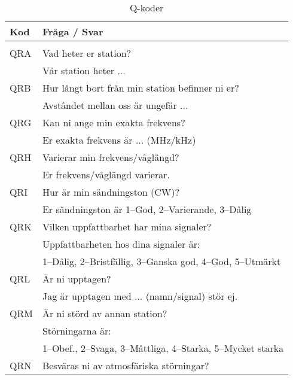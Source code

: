 \begin{longtable}{ll}
	\textbf{Kod} & \textbf{Fråga / Svar}                                                         \\ \hline
	\endhead
	\caption{Q-koder}\\
\endlastfoot
	QRA & Vad heter er station?                                                \\
	    & Vår station heter ...                                                \\ \hline
	QRB & Hur långt bort från min station befinner ni er?                      \\
	    & Avståndet mellan oss är ungefär ...                                  \\ \hline
	QRG & Kan ni ange min exakta frekvens?                                     \\
	    & Er exakta frekvens är ... (MHz/kHz)                                  \\ \hline
	QRH & Varierar min frekvens/våglängd?                                      \\
	    & Er frekvens/våglängd varierar.                                       \\ \hline
	QRI & Hur är min sändningston (CW)?                                        \\
	    & Er sändningston är 1--God, 2--Varierande, 3--Dålig                   \\ \hline
	QRK & Vilken uppfattbarhet har mina signaler?                              \\
	    & Uppfattbarheten hos dina signaler är:                                \\
	    & 1--Dålig, 2--Bristfällig, 3--Ganska god, 4--God, 5--Utmärkt          \\ \hline
	QRL & Är ni upptagen?                                                      \\
	    & Jag är upptagen med ... (namn/signal) stör ej.                       \\ \hline
	QRM & Är ni störd av annan station?                                        \\
	    & Störningarna är:                                                     \\
	    & 1--Obef., 2--Svaga, 3--Måttliga, 4--Starka, 5--Mycket starka         \\ \hline
	QRN & Besväras ni av atmosfäriska störningar?                              \\

\end{longtable}
